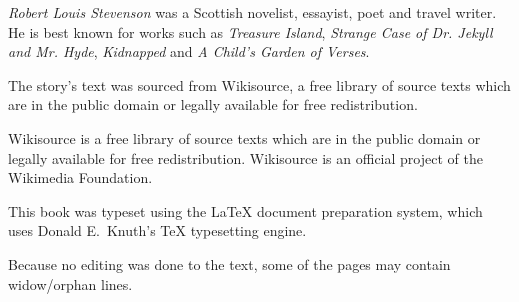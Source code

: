 \documentclass[]{novel}
\begin{document}
\cleartorecto
\backmatter

\thispagestyle{empty}
\label{ch:author}
\begin{ChapterStart}
\vspace*{7\nbs}
\end{ChapterStart}

\emph{Robert Louis Stevenson} was a Scottish novelist, essayist, poet and travel writer. He is best known for works such as \emph{Treasure Island}, \emph{Strange Case of Dr. Jekyll and Mr. Hyde}, \emph{Kidnapped} and \emph{A Child’s Garden of Verses}.

\cleartorecto

\thispagestyle{empty}
\null\vfill
\begin{adjustwidth}{1.375em}{1.375em}
The story’s text was sourced from Wikisource, a free library of source texts which are in the public domain or legally available for free redistribution.

\null

\noindent Wikisource is a free library of source texts which are in the public domain or legally available for free redistribution. Wikisource is an official project of the Wiki\-media Foundation.
\end{adjustwidth}

\vfill{}

\cleartorecto

\thispagestyle{empty}
\null\vfill
\begin{adjustwidth}{1.375em}{1.375em}
This book was typeset using the \LaTeX{} document preparation system, which uses Donald E.~Knuth’s \TeX{} typesetting engine.

\null

\noindent Because no editing was done to the text, some of the pages may contain widow/orphan lines.
\end{adjustwidth}

\vfill{}

\cleartoend
\end{document}
